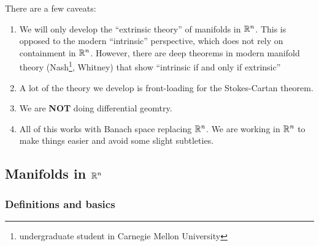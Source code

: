 \documentclass[a4paper]{article}
\begin{document}
There are a few caveats:
\begin{enumerate}
\item We will only develop the ``extrinsic theory'' of
manifolds in $\mathbb{R}^n$. This is opposed to the modern ``intrinsic''
perspective, which does not rely on containment in $\mathbb{R}^n$.
However, there are deep theorems in modern manifold theory
(Nash\footnote{undergraduate student in Carnegie Mellon
University}, Whitney) that show ``intrinsic if and only if
extrinsic''

\item A lot of the theory we develop is front-loading
for the Stokes-Cartan theorem.

\item We are \textbf{NOT} doing differential geomtry.

\item All of this works with Banach space replacing $\mathbb{R}^n$.
We are working in $\mathbb{R}^n$ to make things easier and avoid
some slight subtleties.
\end{enumerate}

\subsection{Manifolds in $\mathbb{R}^n$}

\subsubsection{Definitions and basics}
\end{document}
